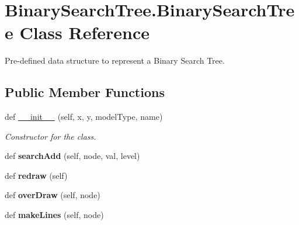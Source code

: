 \hypertarget{class_binary_search_tree_1_1_binary_search_tree}{}\section{Binary\+Search\+Tree.\+Binary\+Search\+Tree Class Reference}
\label{class_binary_search_tree_1_1_binary_search_tree}


Pre-\/defined data structure to represent a Binary Search Tree.  


\subsection*{Public Member Functions}
\begin{DoxyCompactItemize}
\item 
def \hyperlink{class_binary_search_tree_1_1_binary_search_tree_a427e86bf2d372a1b518489843bc85103}{\+\_\+\+\_\+init\+\_\+\+\_\+} (self, x, y, model\+Type, name)
\begin{DoxyCompactList}\small\item\em Constructor for the class. \end{DoxyCompactList}\item 
\mbox{\label{class_binary_search_tree_1_1_binary_search_tree_a5168edcb8e13e75c4d9f9d016cf922e0}} 
def {\bfseries search\+Add} (self, node, val, level)
\item 
\mbox{\label{class_binary_search_tree_1_1_binary_search_tree_a590449bc083a03f8746362ae21081c6b}} 
def {\bfseries redraw} (self)
\item 
\mbox{\label{class_binary_search_tree_1_1_binary_search_tree_a78d7a635850da8941d434365d6447f75}} 
def {\bfseries over\+Draw} (self, node)
\item 
\mbox{\label{class_binary_search_tree_1_1_binary_search_tree_a64a520f74e40f705873893befbe905c3}} 
def {\bfseries make\+Lines} (self, node)
\item 
\mbox{\label{class_binary_search_tree_1_1_binary_search_tree_ae3acf8c976ea9f9dd05d381954c430ed}} 

\end{DoxyCompactItemize}
